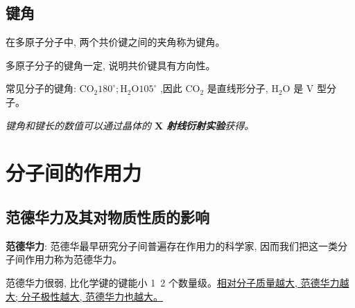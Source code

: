 \documentclass[10pt,cn]{elegantbook}
\begin{document}
\subsection{键角}

 在多原子分子中, 两个共价键之间的夹角称为键角。

多原子分子的键角一定, 说明共价键具有方向性。

常见分子的键角: \({\mathrm{{CO}}}_{2}{180}^{ \circ };{\mathrm{H}}_{2}\mathrm{O}{105}^{ \circ }\) ,因此 \({\mathrm{{CO}}}_{2}\) 是直线形分子, \({\mathrm{H}}_{2}\mathrm{O}\) 是 \(\mathrm{V}\) 型分子。

\textit{键角和键长的数值可以通过晶体的 \(\mathbf{X}\) \textbf{射线衍射实验}获得。}


\section{分子间的作用力}

\subsection{范德华力及其对物质性质的影响}

\textbf{范德华力}: 范德华最早研究分子间普遍存在作用力的科学家, 因而我们把这一类分子间作用力称为范德华力。

范德华力很弱, 比化学键的键能小 1~2 个数量级。\underline{相对分子质量越大, 范德华力越大; 分子极性越大, 范德华力也越大。}

\begin{center}
\end{center}


\begin{center}
\end{center}
\end{document}
